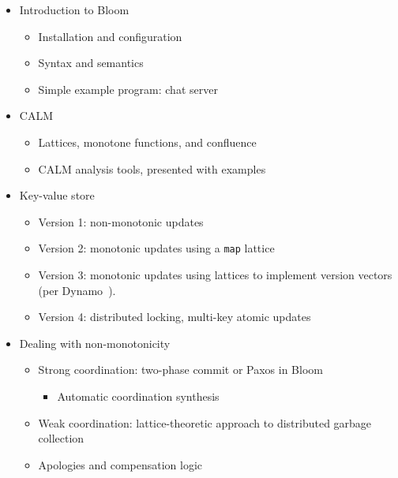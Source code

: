 \documentclass{sig-alternate}
\begin{document}
\begin{itemize}
\item
  Introduction to Bloom
  \begin{itemize}
  \item
    Installation and configuration
  \item
    Syntax and semantics
  \item
    Simple example program: chat server
  \end{itemize}
\item
  CALM
  \begin{itemize}
  \item
    Lattices, monotone functions, and confluence
  \item
    CALM analysis tools, presented with examples
  \end{itemize}
\item
  Key-value store
  \begin{itemize}
  \item
    Version 1: non-monotonic updates
  \item
    Version 2: monotonic updates using a \texttt{map} lattice
  \item
    Version 3: monotonic updates using lattices to implement version vectors
    (per Dynamo~\cite{DeCandia2007}).
  \item
    Version 4: distributed locking, multi-key atomic updates
  \end{itemize}
\item
  Dealing with non-monotonicity
  \begin{itemize}
  \item
    Strong coordination: two-phase commit or Paxos in Bloom
    \begin{itemize}
    \item
      Automatic coordination synthesis
    \end{itemize}
  \item
    Weak coordination: lattice-theoretic approach to distributed garbage
    collection
  \item
    Apologies and compensation logic~\cite{Helland2009}
  \end{itemize}
\end{itemize}



\end{document}
